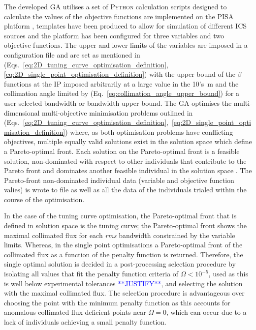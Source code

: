 \documentclass[../main.tex]{subfiles}
\begin{document}
The developed GA utilises a set of \textsc{Python} calculation scripts designed to calculate the values of the objective functions are implemented on the \textsc{PISA} platform \cite{bleuler2003pisa},  templates have been produced to allow for simulation of different ICS sources and the platform has been configured for three variables and two objective functions. The upper and lower limits of the variables are imposed in a configuration file and are set as mentioned in (Eqs.~\ref{eq:2D_tuning_curve_optimisation_definition}, \ref{eq:2D_single_point_optimisation_definition}) with the upper bound of the $\beta$-functions at the IP imposed arbitrarily at a large value in the 10's~\si{\meter} and the collimation angle limited by (Eq.~\ref{eq:collimation_angle_upper_bound}) for a user selected bandwidth or bandwidth upper bound. The GA optimises the multi-dimensional multi-objective minimisation problems outlined in (Eqs.~\ref{eq:2D_tuning_curve_optimisation_definition},~\ref{eq:2D_single_point_optimisation_definition}) where, as both optimisation problems have conflicting objectives, multiple equally valid solutions exist in the solution space which define a Pareto-optimal front. Each solution on the Pareto-optimal front is a feasible solution, non-dominated with respect to other individuals that contribute to the Pareto front and dominates another feasible individual in the solution space \cite{hofler2013innovative}. The Pareto-front non-dominated individual data (variable and objective function valies) is wrote to file as well as all the data of the individuals trialed within the course of the optimisation.  

In the case of the tuning curve optimisation, the Pareto-optimal front that is defined in solution space is the tuning curve; the Pareto-optimal front shows the maximal collimated flux for each \textit{rms} bandwidth constrained by the variable limits. Whereas, in the single point optimisations a Pareto-optimal front of the collimated flux as a function of the penalty function is returned. Therefore, the single optimal solution is decided in a post-processing selection procedure by isolating all values that fit the penalty function criteria of $\Omega < 10^{-5}$, used as this is well below experimental tolerances \textcolor{blue}{**JUSTIFY**}, and selecting the solution with the maximal collimated flux. The selection procedure is advantageous over choosing the point with the minimum penalty function as this accounts for anomalous collimated flux deficient points near $\Omega = 0$, which can occur due to a lack of individuals achieving a small penalty function.          
\end{document}
